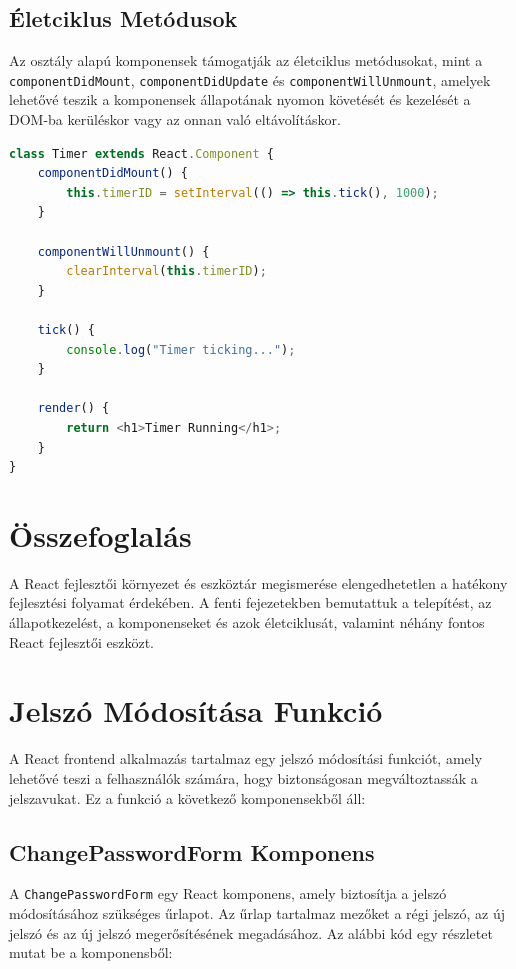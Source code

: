 \documentclass[colorlinks]{thesis-kando}
\theoremstyle{definition}
\theoremstyle{remark}
\begin{document}
\pagebreak

\subsection{Életciklus Metódusok}
Az osztály alapú komponensek támogatják az életciklus metódusokat, mint a \texttt{componentDidMount}, \texttt{componentDidUpdate} és \texttt{componentWillUnmount}, amelyek lehetővé teszik a komponensek állapotának nyomon követését és kezelését a DOM-ba kerüléskor vagy az onnan való eltávolításkor.

\begin{lstlisting}[language=JavaScript]
class Timer extends React.Component {
    componentDidMount() {
        this.timerID = setInterval(() => this.tick(), 1000);
    }

    componentWillUnmount() {
        clearInterval(this.timerID);
    }

    tick() {
        console.log("Timer ticking...");
    }

    render() {
        return <h1>Timer Running</h1>;
    }
}
\end{lstlisting}

\section{Összefoglalás}
A React fejlesztői környezet és eszköztár megismerése elengedhetetlen a hatékony fejlesztési folyamat érdekében. A fenti fejezetekben bemutattuk a telepítést, az állapotkezelést, a komponenseket és azok életciklusát, valamint néhány fontos React fejlesztői eszközt.

\section{Jelszó Módosítása Funkció}
A React frontend alkalmazás tartalmaz egy jelszó módosítási funkciót, amely lehetővé teszi a felhasználók számára, hogy biztonságosan megváltoztassák a jelszavukat. Ez a funkció a következő komponensekből áll:

\subsection{ChangePasswordForm Komponens}
A \texttt{ChangePasswordForm} egy React komponens, amely biztosítja a jelszó módosításához szükséges űrlapot. Az űrlap tartalmaz mezőket a régi jelszó, az új jelszó és az új jelszó megerősítésének megadásához. Az alábbi kód egy részletet mutat be a komponensből:
\end{document}
